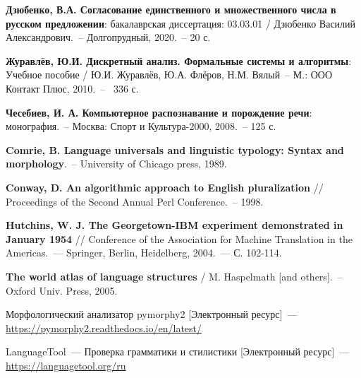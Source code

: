 \documentclass[oneside, final, 12pt]{article}
\theoremstyle{plain}
\theoremstyle{plain} %
\begin{document}

\begin{thebibliography}{500}
	

\textbf{ Дзюбенко, В.А. Согласование единственного и множественного числа в русском предложении}: бакалаврская диссертация: 03.03.01 / Дзюбенко Василий Александрович.~-- Долгопрудный, 2020.~-- 20 с.

\textbf{ Журавлёв, Ю.И. Дискретный анализ. Формальные системы и алгоритмы}: Учебное пособие / Ю.И. Журавлёв, Ю.А. Флёров, Н.М. Вялый~-- М.: ООО Контакт Плюс, 2010.~--~ 336 с.


 \textbf{Чесебиев, И. А. Компьютерное распознавание и порождение речи}: монография.~-- Москва: Спорт и Культура-2000, 2008.~-- 125 с.

 \textbf{Comrie, B. Language universals and linguistic typology: Syntax and morphology}.~-- University of Chicago press, 1989.

 \textbf{Conway, D. An algorithmic approach to English pluralization} // Proceedings of the Second Annual Perl Conference.~-- 1998.

 \textbf{Hutchins, W. J. The Georgetown-IBM experiment demonstrated in January 1954} // Conference of the Association for Machine Translation in the Americas.~--- Springer, Berlin, Heidelberg, 2004.~--- С. 102-114.

 \textbf{The world atlas of language structures} / M. Haspelmath [and others].~-- Oxford Univ. Press, 2005.

 Морфологический анализатор pymorphy2 [Электронный ресурс]~--- \href{https://pymorphy2.readthedocs.io/en/latest/}{https://pymorphy2.readthedocs.io/en/latest/}

 LanguageTool~--- Проверка грамматики и стилистики [Электронный ресурс]~--- \href{https://languagetool.org/ru}{https://languagetool.org/ru}


\end{thebibliography}
\pagebreak

\appendix


\pagebreak

\end{document}
